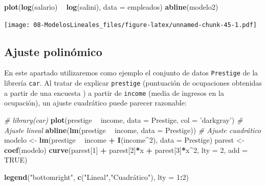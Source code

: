 \documentclass[]{book}
\newenvironment{Shaded}{\begin{snugshade}}{\end{snugshade}}
\newcommand{\CommentTok}[1]{\textcolor[rgb]{0.56,0.35,0.01}{\textit{#1}}}
\newcommand{\DataTypeTok}[1]{\textcolor[rgb]{0.13,0.29,0.53}{#1}}
\newcommand{\DecValTok}[1]{\textcolor[rgb]{0.00,0.00,0.81}{#1}}
\newcommand{\KeywordTok}[1]{\textcolor[rgb]{0.13,0.29,0.53}{\textbf{#1}}}
\newcommand{\NormalTok}[1]{#1}
\newcommand{\OperatorTok}[1]{\textcolor[rgb]{0.81,0.36,0.00}{\textbf{#1}}}
\newcommand{\OtherTok}[1]{\textcolor[rgb]{0.56,0.35,0.01}{#1}}
\newcommand{\StringTok}[1]{\textcolor[rgb]{0.31,0.60,0.02}{#1}}
\begin{document}
\begin{Shaded}
\begin{Highlighting}[]
\KeywordTok{plot}\NormalTok{(}\KeywordTok{log}\NormalTok{(salario) }\OperatorTok{~}\StringTok{ }\KeywordTok{log}\NormalTok{(salini), }\DataTypeTok{data =}\NormalTok{ empleados)}
\KeywordTok{abline}\NormalTok{(modelo2)}
\end{Highlighting}
\end{Shaded}

\texttt{[image: 08-ModelosLineales\_files/figure-latex/unnamed-chunk-45-1.pdf]}

\hypertarget{ajuste-polinomico}{%
\subsection{Ajuste polinómico}\label{ajuste-polinomico}}

En este apartado utilizaremos como ejemplo el conjunto de datos \texttt{Prestige} de la librería \texttt{car}. Al tratar de explicar \texttt{prestige} (puntuación de ocupaciones obtenidas a partir de una encuesta ) a partir de \texttt{income} (media de ingresos en la ocupación), un ajuste cuadrático puede parecer razonable:

\begin{Shaded}
\begin{Highlighting}[]
\CommentTok{# library(car)}
\KeywordTok{plot}\NormalTok{(prestige }\OperatorTok{~}\StringTok{ }\NormalTok{income, }\DataTypeTok{data =}\NormalTok{ Prestige, }\DataTypeTok{col =} \StringTok{'darkgray'}\NormalTok{)}
\CommentTok{# Ajuste lineal}
\KeywordTok{abline}\NormalTok{(}\KeywordTok{lm}\NormalTok{(prestige }\OperatorTok{~}\StringTok{ }\NormalTok{income, }\DataTypeTok{data =}\NormalTok{ Prestige)) }
\CommentTok{# Ajuste cuadrático}
\NormalTok{modelo <-}\StringTok{ }\KeywordTok{lm}\NormalTok{(prestige }\OperatorTok{~}\StringTok{ }\NormalTok{income }\OperatorTok{+}\StringTok{ }\KeywordTok{I}\NormalTok{(income}\OperatorTok{^}\DecValTok{2}\NormalTok{), }\DataTypeTok{data =}\NormalTok{ Prestige)}
\NormalTok{parest <-}\StringTok{ }\KeywordTok{coef}\NormalTok{(modelo)}
\KeywordTok{curve}\NormalTok{(parest[}\DecValTok{1}\NormalTok{] }\OperatorTok{+}\StringTok{ }\NormalTok{parest[}\DecValTok{2}\NormalTok{]}\OperatorTok{*}\NormalTok{x }\OperatorTok{+}\StringTok{ }\NormalTok{parest[}\DecValTok{3}\NormalTok{]}\OperatorTok{*}\NormalTok{x}\OperatorTok{^}\DecValTok{2}\NormalTok{, }\DataTypeTok{lty =} \DecValTok{2}\NormalTok{, }\DataTypeTok{add =} \OtherTok{TRUE}\NormalTok{)}

\KeywordTok{legend}\NormalTok{(}\StringTok{"bottomright"}\NormalTok{, }\KeywordTok{c}\NormalTok{(}\StringTok{"Lineal"}\NormalTok{,}\StringTok{"Cuadrático"}\NormalTok{), }\DataTypeTok{lty =} \DecValTok{1}\OperatorTok{:}\DecValTok{2}\NormalTok{)}
\end{Highlighting}
\end{Shaded}
\end{document}
